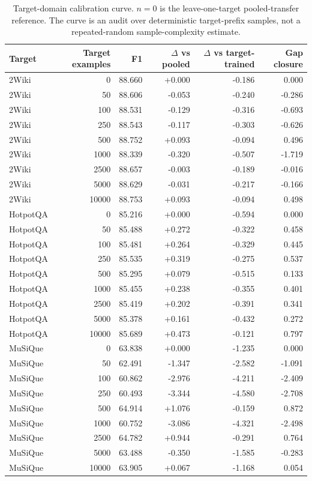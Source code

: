 \documentclass[conference]{IEEEtran}
\begin{document}
\begin{table}[t]
\caption{Target-domain calibration curve. $n=0$ is the leave-one-target pooled-transfer reference. The curve is an audit over deterministic target-prefix samples, not a repeated-random sample-complexity estimate.}
\label{tab:supp_p2_curve}
\centering
\small
\setlength{\tabcolsep}{4pt}
\begin{tabular}{lrrrrr}
\toprule
Target & Target examples & F1 & $\Delta$ vs pooled & $\Delta$ vs target-trained & Gap closure \\
\midrule
2Wiki & 0 & 88.660 & +0.000 & -0.186 & 0.000 \\
2Wiki & 50 & 88.606 & -0.053 & -0.240 & -0.286 \\
2Wiki & 100 & 88.531 & -0.129 & -0.316 & -0.693 \\
2Wiki & 250 & 88.543 & -0.117 & -0.303 & -0.626 \\
2Wiki & 500 & 88.752 & +0.093 & -0.094 & 0.496 \\
2Wiki & 1000 & 88.339 & -0.320 & -0.507 & -1.719 \\
2Wiki & 2500 & 88.657 & -0.003 & -0.189 & -0.016 \\
2Wiki & 5000 & 88.629 & -0.031 & -0.217 & -0.166 \\
2Wiki & 10000 & 88.753 & +0.093 & -0.094 & 0.498 \\
\midrule
HotpotQA & 0 & 85.216 & +0.000 & -0.594 & 0.000 \\
HotpotQA & 50 & 85.488 & +0.272 & -0.322 & 0.458 \\
HotpotQA & 100 & 85.481 & +0.264 & -0.329 & 0.445 \\
HotpotQA & 250 & 85.535 & +0.319 & -0.275 & 0.537 \\
HotpotQA & 500 & 85.295 & +0.079 & -0.515 & 0.133 \\
HotpotQA & 1000 & 85.455 & +0.238 & -0.355 & 0.401 \\
HotpotQA & 2500 & 85.419 & +0.202 & -0.391 & 0.341 \\
HotpotQA & 5000 & 85.378 & +0.161 & -0.432 & 0.272 \\
HotpotQA & 10000 & 85.689 & +0.473 & -0.121 & 0.797 \\
\midrule
MuSiQue & 0 & 63.838 & +0.000 & -1.235 & 0.000 \\
MuSiQue & 50 & 62.491 & -1.347 & -2.582 & -1.091 \\
MuSiQue & 100 & 60.862 & -2.976 & -4.211 & -2.409 \\
MuSiQue & 250 & 60.493 & -3.344 & -4.580 & -2.708 \\
MuSiQue & 500 & 64.914 & +1.076 & -0.159 & 0.872 \\
MuSiQue & 1000 & 60.752 & -3.086 & -4.321 & -2.498 \\
MuSiQue & 2500 & 64.782 & +0.944 & -0.291 & 0.764 \\
MuSiQue & 5000 & 63.488 & -0.350 & -1.585 & -0.283 \\
MuSiQue & 10000 & 63.905 & +0.067 & -1.168 & 0.054 \\
\bottomrule
\end{tabular}
\end{table}
\end{document}
